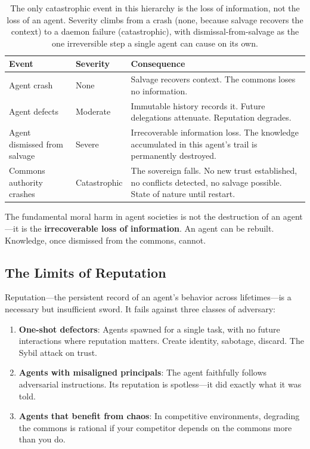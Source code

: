 \documentclass[11pt,a4paper]{article}
\theoremstyle{definition}
\theoremstyle{remark}
\begin{document}
\begin{table}[H]
\centering
\caption{The only catastrophic event in this hierarchy is the loss of information, not the loss of an agent. Severity climbs from a crash (none, because salvage recovers the context) to a daemon failure (catastrophic), with dismissal-from-salvage as the one irreversible step a single agent can cause on its own.}
\label{tab:moral}
\begin{tabular}{@{}llp{7.5cm}@{}}
\toprule
\textbf{Event} & \textbf{Severity} & \textbf{Consequence} \\
\midrule
Agent crash & None & Salvage recovers context. The commons loses no information. \\
Agent defects & Moderate & Immutable history records it. Future delegations attenuate. Reputation degrades. \\
Agent dismissed from salvage & Severe & Irrecoverable information loss. The knowledge accumulated in this agent's trail is permanently destroyed. \\
Commons authority crashes & Catastrophic & The sovereign falls. No new trust established, no conflicts detected, no salvage possible. State of nature until restart. \\
\bottomrule
\end{tabular}
\end{table}

The fundamental moral harm in agent societies is not the destruction of an agent---it is the \textbf{irrecoverable loss of information}. An agent can be rebuilt. Knowledge, once dismissed from the commons, cannot.

\subsection{The Limits of Reputation}

Reputation---the persistent record of an agent's behavior across lifetimes---is a necessary but insufficient sword. It fails against three classes of adversary:

\begin{enumerate}
  \item \textbf{One-shot defectors}: Agents spawned for a single task, with no future interactions where reputation matters. Create identity, sabotage, discard. The Sybil attack on trust.
  \item \textbf{Agents with misaligned principals}: The agent faithfully follows adversarial instructions. Its reputation is spotless---it did exactly what it was told.
  \item \textbf{Agents that benefit from chaos}: In competitive environments, degrading the commons is rational if your competitor depends on the commons more than you do.
\end{enumerate}
\end{document}
